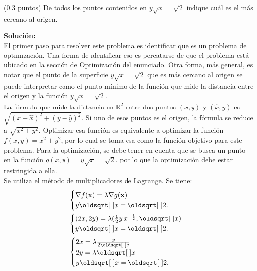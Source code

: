 \documentclass{fmbvecto}
\begin{document}
\phantom{} %

\begin{problema}
    
    (\(0.\bar{3}\) puntos)  De todos los puntos contenidos en \(y\sqrt{x} = \sqrt{2}\) indique cuál es el más cercano al origen.

\vspace{1em}
\tcblower
\textbf{Solución:}\\

El primer paso para resolver este problema es identificar que es un problema de optimización. Una forma de identificar eso es percatarse de que el problema está ubicado en la sección de Optimización del enunciado. Otra forma, más general, es notar que el punto de la superficie \(y\sqrt{x} = \sqrt{2}\) que es más cercano al origen se puede interpretar como el punto mínimo de la función que mide la distancia entre el origen y la función \(y\sqrt{x} = \sqrt{2}\).\\

La fórmula que mide la distancia en \(\mathbb{R}^2\) entre dos puntos \((x,y)\) y \((\hat{x},\hat{y})\) es \(\sqrt{(x-\hat{x})^2+(y-\hat{y})^2}\). Si uno de esos puntos es el origen, la fórmula se reduce a \(\sqrt{x^2+y^2}\). Optimizar esa función es equivalente a optimizar la función \(f(x, y) = x^2+y^2\), por lo cual se toma esa como la función objetivo para este problema. Para la optimización, se debe tener en cuenta que se busca un punto en la función \(g(x, y) = y\sqrt{x} = \sqrt{2}\), por lo que la optimización debe estar restringida a ella. \\

Se utiliza el método de multiplicadores de Lagrange. Se tiene:
\begin{align*}
    &\begin{cases}
        \nabla f(\bvec{x}) = \lambda \nabla g(\bvec{x}) \\
        y\sqrt{x} = \sqrt{2}.
    \end{cases} \\
    &\begin{cases}
        (2x, 2y) = \lambda (\frac{1}{2}y \, x^{-\frac{1}{2}}, \sqrt{x}) \\
        y\sqrt{x} = \sqrt{2}.
    \end{cases} \\
    &\begin{cases}
        2x = \lambda \frac{y}{2\sqrt{x}} \\
        2y = \lambda \sqrt{x} \\
        y\sqrt{x} = \sqrt{2}.
    \end{cases}
\end{align*}


\end{problema}
\end{document}
